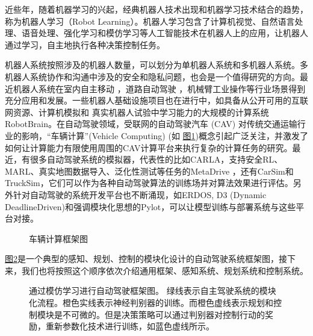 \documentclass[letterpaper,10pt,english]{sphinxmanual}
\let\sphinxpxdimen\pdfpxdimen\else\newdimen\sphinxpxdimen
\begin{document}
\sphinxAtStartPar
近些年，随着机器学习的兴起，经典机器人技术出现和机器学习技术结合的趋势，称为机器人学习（Robot
Learning）。机器人学习包含了计算机视觉、自然语言处理、语音处理、强化学习和模仿学习等人工智能技术在机器人上的应用，让机器人通过学习，自主地执行各种决策控制任务。

\sphinxAtStartPar
机器人系统按照涉及的机器人数量，可以划分为单机器人系统和多机器人系统。多机器人系统协作和沟通中涉及的安全和隐私问题，也会是一个值得研究的方向。最近机器人系统在室内自主移动
，道路自动驾驶
，机械臂工业操作等行业场景得到充分应用和发展。一些机器人基础设施项目也在进行中，如具备从公开可用的互联网资源、计算机模拟和
真实机器人试验中学习能力的大规模的计算系统RobotBrain。在自动驾驶领域，受联网的自动驾驶汽车
(CAV) 对传统交通运输行业的影响，“车辆计算”(Vehicle Computing) (如
\hyperref[\detokenize{chapter_rl_sys/rl_sys_intro:vehicle-computing}]{图\ref{\detokenize{chapter_rl_sys/rl_sys_intro:vehicle-computing}}})概念引起广泛关注，并激发了如何让计算能力有限使用周围的CAV计算平台来执行复杂的计算任务的研究。最近，有很多自动驾驶系统的模拟器，代表性的比如CARLA，支持安全RL、MARL、真实地图数据导入、泛化性测试等任务的MetaDrive
，还有CarSim和
TruckSim，它们可以作为各种自动驾驶算法的训练场并对算法效果进行评估。另外针对自动驾驶的系统开发平台也不断涌现，如ERDOS,
D3 (Dynamic
Deadline\sphinxhyphen{}Driven)和强调模块化思想的Pylot，可以让模型训练与部署系统与这些平台对接。

\begin{figure}[H]
\centering
\capstart

\noindent\sphinxincludegraphics[width=800\sphinxpxdimen]{{vehicle_computing}.png}
\caption{车辆计算框架图 }\label{\detokenize{chapter_rl_sys/rl_sys_intro:id9}}\label{\detokenize{chapter_rl_sys/rl_sys_intro:vehicle-computing}}\end{figure}

\sphinxAtStartPar
\hyperref[\detokenize{chapter_rl_sys/rl_sys_intro:learning-decision-module}]{图\ref{\detokenize{chapter_rl_sys/rl_sys_intro:learning-decision-module}}}是一个典型的感知、规划、控制的模块化设计的自动驾驶系统框架图，接下来，我们也将按照这个顺序依次介绍通用框架、感知系统、规划系统和控制系统。

\begin{figure}[H]
\centering
\capstart

\noindent\sphinxincludegraphics[width=800\sphinxpxdimen]{{idm}.png}
\caption{通过模仿学习进行自动驾驶框架图。
绿线表示自主驾驶系统的模块化流程。橙色实线表示神经判别器的训练。而橙色虚线表示规划和控制模块是不可微的。但是决策策略可以通过判别器对控制行动的奖励，重新参数化技术进行训练，如蓝色虚线所示。}\label{\detokenize{chapter_rl_sys/rl_sys_intro:id10}}\label{\detokenize{chapter_rl_sys/rl_sys_intro:learning-decision-module}}\end{figure}
\end{document}
